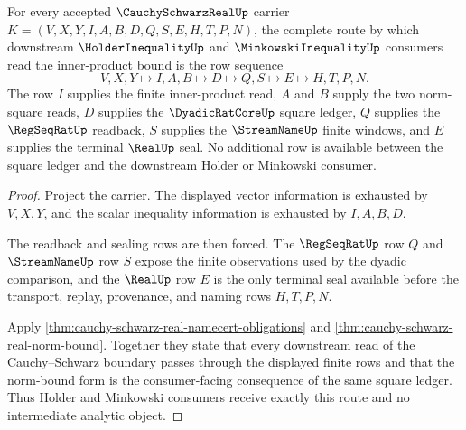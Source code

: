 \begin{theorem}
\label{thm:cauchy-schwarz-real-innerproduct-bound}
For every accepted $\CauchySchwarzRealUp$ carrier $K=(V,X,Y,I,A,B,D,Q,S,E,H,T,P,N)$, the complete route by which downstream $\HolderInequalityUp$ and $\MinkowskiInequalityUp$ consumers read the inner-product bound is the row sequence
$$
V,X,Y \longmapsto I,A,B \longmapsto D \longmapsto Q,S \longmapsto E \longmapsto H,T,P,N .
$$
The row $I$ supplies the finite inner-product read, $A$ and $B$ supply the two norm-square reads, $D$ supplies the $\DyadicRatCoreUp$ square ledger, $Q$ supplies the $\RegSeqRatUp$ readback, $S$ supplies the $\StreamNameUp$ finite windows, and $E$ supplies the terminal $\RealUp$ seal. No additional row is available between the square ledger and the downstream Holder or Minkowski consumer.
\end{theorem}
\begin{proof}
Project the carrier. The displayed vector information is exhausted by $V,X,Y$, and the scalar inequality information is exhausted by $I,A,B,D$.

The readback and sealing rows are then forced. The $\RegSeqRatUp$ row $Q$ and $\StreamNameUp$ row $S$ expose the finite observations used by the dyadic comparison, and the $\RealUp$ row $E$ is the only terminal seal available before the transport, replay, provenance, and naming rows $H,T,P,N$.

Apply \autoref{thm:cauchy-schwarz-real-namecert-obligations} and \autoref{thm:cauchy-schwarz-real-norm-bound}. Together they state that every downstream read of the Cauchy--Schwarz boundary passes through the displayed finite rows and that the norm-bound form is the consumer-facing consequence of the same square ledger. Thus Holder and Minkowski consumers receive exactly this route and no intermediate analytic object.
\end{proof}

